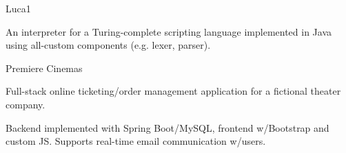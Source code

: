 
\begin{cventries}
  \cventry
    {} %
    {\hspace{-45mm}Luca1} %
    {} %
    {} %
    {
      \begin{cvitems} %
        \item {An interpreter for a Turing-complete scripting language implemented in Java using all-custom components (e.g. lexer, parser).}
      \end{cvitems}
    }

  \cventry
    {} %
    {\hspace{-45mm}Premiere Cinemas} %
    {} %
    {} %
    {
      \begin{cvitems} %
      	\item {Full-stack online ticketing/order management application for a fictional theater company.}
		\item {Backend implemented with Spring Boot/MySQL, frontend w/Bootstrap and custom JS. Supports real-time email communication w/users.}
      \end{cvitems}
    }
\end{cventries}
